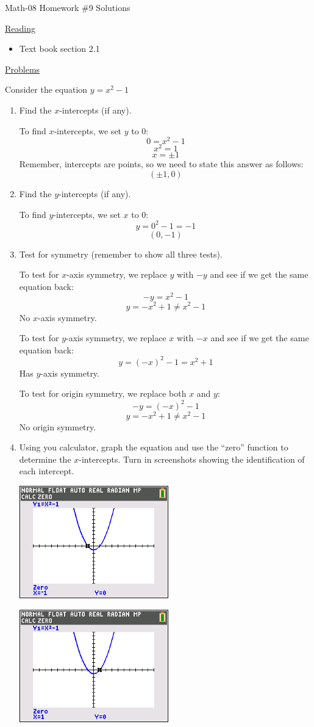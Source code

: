 \documentclass[letterpaper,12pt,fleqn]{article}
\begin{document}
\begin{center}
\Large Math-08 Homework \#9 Solutions
\end{center}

\vspace{0.5in}

\underline{Reading}

\begin{itemize}
\item Text book section 2.1
\end{itemize}

\underline{Problems}

Consider the equation $y=x^2-1$
\begin{enumerate}
\item Find the $x$-intercepts (if any).

  To find $x$-intercepts, we set $y$ to 0:
  \[0=x^2-1\]
  \[x^2=1\]
  \[x=\pm1\]
  Remember, intercepts are points, so we need to state this answer as
  follows:
  \[(\pm1,0)\]
  
\item Find the $y$-intercepts (if any).

  To find $y$-intercepts, we set $x$ to 0:
  \[y=0^2-1=-1\]
  \[(0,-1)\]

\item Test for symmetry (remember to show all three tests).

  To test for $x$-axis symmetry, we replace $y$ with $-y$ and see if we get
  the same equation back:
  \[-y=x^2-1\]
  \[y=-x^2+1\ne x^2-1\]
  No $x$-axis symmetry.

  To test for $y$-axis symmetry, we replace $x$ with $-x$ and see if we get
  the same equation back:
  \[y=(-x)^2-1=x^2+1\]
  Has $y$-axis symmetry.

  To test for origin symmetry, we replace both $x$ and $y$:
  \[-y=(-x)^2-1\]
  \[y=-x^2+1\ne x^2-1\]
  No origin symmetry.

\item Using you calculator, graph the equation and use the ``zero'' function
  to determine the $x$-intercepts. Turn in screenshots showing the
  identification of each intercept.

  \includegraphics{hw11-4-1}

  \includegraphics{hw11-4-2}
\end{enumerate}
\end{document}
